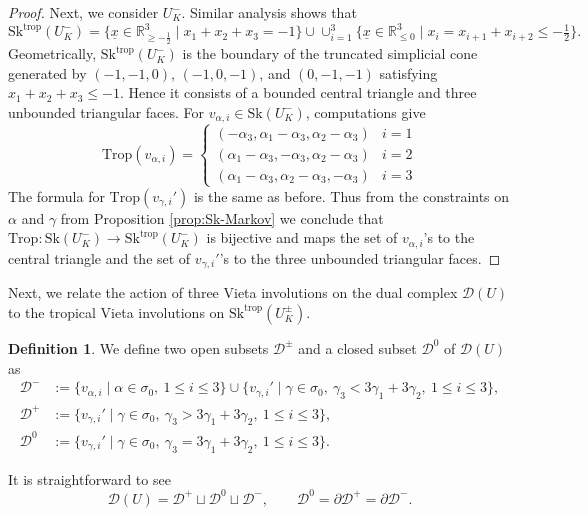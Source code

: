 \documentclass[reqno, 12pt]{amsart}
\theoremstyle{definition}
\newtheorem{defn}[prop]{Definition}
\newcommand{\bR}{\mathbb{R}}
\newcommand{\cD}{\mathcal{D}}
\newcommand{\Trop}{\mathrm{Trop}}
\newcommand{\trop}{\mathrm{trop}}
\newcommand{\Sk}{\mathrm{Sk}}
\newcommand{\ux}{\underline{x}}
\numberwithin{equation}{section}
\begin{document}
\begin{proof}
Next, we consider $U_K^-$. Similar analysis shows that 
\[
\Sk^{\trop}(U_K^-) =\{\ux\in \bR_{\geq -\tfrac{1}{2}}^3\mid x_1+x_2+x_3 = -1\}\cup \cup_{i=1}^3 \{\ux\in  \bR_{\leq 0}^3\mid x_i = x_{i+1}+x_{i+2}\leq -\tfrac{1}{2}\}.
\]
Geometrically, $\Sk^{\trop}(U_K^-)$ is the boundary of the truncated simplicial cone generated by $(-1,-1,0)$, $(-1,0,-1)$, and $(0,-1,-1)$ satisfying $x_1+x_2+x_3\leq -1$. Hence it consists of a bounded central triangle and three unbounded triangular faces.
For $v_{\alpha,i}\in \Sk(U_K^{-})$, computations give
\[
\Trop(v_{\alpha,i}) =\begin{cases}
(-\alpha_3, \alpha_1 - \alpha_3, \alpha_2 - \alpha_3) & i = 1\\
(\alpha_1-\alpha_3, -\alpha_3, \alpha_2 - \alpha_3) & i = 2\\
(\alpha_1-\alpha_3, \alpha_2 - \alpha_3, -\alpha_3) & i = 3
\end{cases}
\]
The formula for $\Trop(v_{\gamma,i}')$ is the same as before. Thus from the constraints on $\alpha$ and $\gamma$ from Proposition \ref{prop:Sk-Markov} we conclude that $\Trop:\Sk(U_K^-) \to \Sk^{\trop}(U_K^-)$ is bijective and maps the set of $v_{\alpha,i}$'s to the central triangle and the set of $v_{\gamma,i}'$'s to the three unbounded triangular faces.
\end{proof}


Next, we relate the action of three Vieta involutions on the dual complex $\cD(U)$ to the tropical Vieta involutions on $\Sk^{\trop}(U_K^{\pm})$. 

\begin{defn}\label{def:D^pm}
We define two open subsets $\cD^{\pm}$ and a closed subset $\cD^0$ of $\cD(U)$ as 
\begin{align*}
\cD^- &:= \{v_{\alpha,i}\mid \alpha\in \sigma_0, ~1\leq i\leq 3\} \cup \{v_{\gamma, i}'\mid \gamma\in \sigma_0, ~\gamma_3<3\gamma_1+3\gamma_2 ,~1\leq i\leq 3\},\\
\cD^+ &:= \{v_{\gamma, i}'\mid \gamma\in \sigma_0,~\gamma_3 > 3\gamma_1+3\gamma_2,~1\leq i\leq 3\},\\
\cD^0 & := \{v_{\gamma, i}'\mid \gamma\in \sigma_0,~\gamma_3 = 3\gamma_1+3\gamma_2,~1\leq i\leq 3\}.
\end{align*}
\end{defn}

It is straightforward to see 
\[
\cD(U) = \cD^+\sqcup \cD^0 \sqcup \cD^-, \qquad \cD^0 = \partial \cD^+ = \partial \cD^-.
\]

\end{document}
